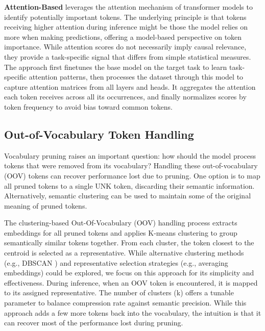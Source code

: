\documentclass[twocolumn]{article}
\begin{document}
\textbf{Attention-Based}
leverages the attention mechanism of transformer models to identify potentially important tokens. The underlying principle is that tokens receiving higher attention during inference might be those the model relies on more when making predictions, offering a model-based perspective on token importance\cite{guo2024attention}. While attention scores do not necessarily imply causal relevance, they provide a task-specific signal that differs from simple statistical measures. The approach first finetunes the base model on the target task to learn task-specific attention patterns, then processes the dataset through this model to capture attention matrices from all layers and heads. It aggregates the attention each token receives across all its occurrences, and finally normalizes scores by token frequency to avoid bias toward common tokens.


\subsection{Out-of-Vocabulary Token Handling}
Vocabulary pruning raises an important question: how should the model process tokens that were removed from its vocabulary? Handling these out-of-vocabulary (OOV) tokens can recover performance lost due to pruning.
One option is to map all pruned tokens to a single UNK token, discarding their semantic information.
Alternatively, semantic clustering can be used to maintain some of the original meaning of pruned tokens.

The clustering-based Out-Of-Vocabulary (OOV) handling process extracts embeddings for all pruned tokens and applies K-means clustering to group semantically similar tokens together. From each cluster, the token closest to the centroid is selected as a representative. While alternative clustering methods (e.g., DBSCAN \cite{wang2019dbscan}) and representative selection strategies (e.g., averaging embeddings) could be explored, we focus on this approach for its simplicity and effectiveness. During inference, when an OOV token is encountered, it is mapped to its assigned representative.
The number of clusters (k) offers a tunable parameter to balance compression rate against semantic precision. While this approach adds a few more tokens back into the vocabulary, the intuition is that it can recover most of the performance lost during pruning.
\end{document}
